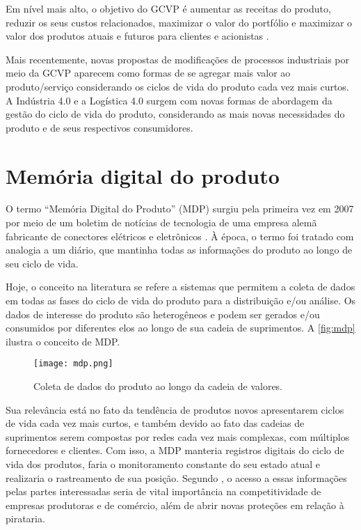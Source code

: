 Em nível mais alto, o objetivo do GCVP é aumentar as receitas do produto, reduzir os seus custos relacionados, maximizar o valor do portfólio e maximizar o valor dos produtos atuais e futuros para clientes e acionistas \cite{stark2015lifecycle}.

Mais recentemente, novas propostas de modificações de processos industriais por meio da GCVP aparecem como formas de se agregar mais valor ao produto/serviço considerando os ciclos de vida do produto cada vez mais curtos. A Indústria 4.0 e a Logística 4.0 surgem com novas formas de abordagem da gestão do ciclo de vida do produto, considerando as mais novas necessidades do produto e de seus respectivos consumidores.

\section{Memória digital do produto}

O termo ``Memória Digital do Produto'' (MDP) surgiu pela primeira vez em 2007 por meio de um boletim de notícias de tecnologia de uma empresa alemã fabricante de conectores elétricos e eletrônicos \cite{wahlster2007digitalmemory}. À época, o termo foi tratado com analogia a um diário, que mantinha todas as informações do produto ao longo de seu ciclo de vida.

Hoje, o conceito na literatura se refere a sistemas que permitem a coleta de dados em todas as fases do ciclo de vida do produto para a distribuição e/ou análise. Os dados de interesse do produto são heterogêneos e podem ser gerados e/ou consumidos por diferentes elos ao longo de sua cadeia de suprimentos. A \autoref{fig:mdp} ilustra o conceito de MDP.

\begin{figure}[htb]
	\centering
	\texttt{[image: mdp.png]}
	\caption{Coleta de dados do produto ao longo da cadeia de valores.}
	\label{fig:mdp}
\end{figure}

Sua relevância está no fato da tendência de produtos novos apresentarem ciclos de vida cada vez mais curtos, e também devido ao fato das cadeias de suprimentos serem compostas por redes cada vez mais complexas, com múltiplos fornecedores e clientes. Com isso, a MDP manteria registros digitais do ciclo de vida dos produtos, faria o monitoramento constante do seu estado atual e realizaria o rastreamento de sua posição. Segundo , o acesso a essas informações pelas partes interessadas seria de vital importância na competitividade de empresas produtoras e de comércio, além de abrir novas proteções em relação à pirataria.

